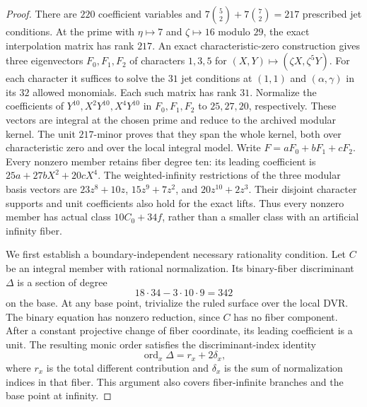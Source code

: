 \begin{proof}
There are $220$ coefficient variables and
$7\binom52+7\binom72=217$ prescribed jet conditions.
At the prime with $\eta\mapsto7$ and $\zeta\mapsto16$ modulo $29$,
the exact interpolation matrix has rank $217$.
An exact characteristic-zero construction gives three eigenvectors
$F_0,F_1,F_2$ of characters $1,3,5$ for
$(X,Y)\mapsto(\zeta X,\zeta^5Y)$.
For each character it suffices to solve the $31$ jet conditions at
$(1,1)$ and $(\alpha,\gamma)$ in its $32$ allowed monomials.
Each such matrix has rank $31$.
Normalize the coefficients of $Y^{10},X^2Y^{10},X^4Y^{10}$ in
$F_0,F_1,F_2$ to $25,27,20$, respectively.
These vectors are integral at the chosen prime and reduce to the
archived modular kernel.  The unit $217$-minor proves that they span the
whole kernel, both over characteristic zero and over the local integral
model.  Write $F=aF_0+bF_1+cF_2$.
Every nonzero member retains fiber degree ten: its leading coefficient
is $25a+27bX^2+20cX^4$.
The weighted-infinity restrictions of the three modular basis vectors are
$23z^8+10z$, $15z^9+7z^2$, and $20z^{10}+2z^3$.
Their disjoint character supports and unit coefficients also hold for
the exact lifts.  Thus every nonzero member has actual class
$10C_0+34f$, rather than a smaller class with an artificial infinity fiber.

We first establish a boundary-independent necessary rationality condition.
Let $C$ be an integral member with rational normalization.
Its binary-fiber discriminant $\Delta$ is a section of degree
\[
 18\cdot34-3\cdot10\cdot9=342
\]
on the base.  At any base point, trivialize the ruled surface over the
local DVR.  The binary equation has nonzero reduction, since $C$ has no
fiber component.  After a constant projective change of fiber coordinate,
its leading coefficient is a unit.  The resulting monic order satisfies
the discriminant-index identity
\[
 \operatorname{ord}_x\Delta=r_x+2\delta_x,
\]
where $r_x$ is the total different contribution and $\delta_x$ is the
sum of normalization indices in that fiber.  This argument also covers
fiber-infinite branches and the base point at infinity.


\end{proof}
